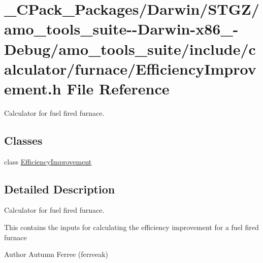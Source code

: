 \hypertarget{___c_pack___packages_2_darwin_2_s_t_g_z_2amo__tools__suite--_darwin-x86__64-_debug_2amo__tools__746a37b72f5159a376bd4f5e36a4146f}{}\section{\+\_\+\+C\+Pack\+\_\+\+Packages/\+Darwin/\+S\+T\+G\+Z/amo\+\_\+tools\+\_\+suite-\/-\/\+Darwin-\/x86\+\_-\/\+Debug/amo\+\_\+tools\+\_\+suite/include/calculator/furnace/\+Efficiency\+Improvement.h File Reference}
\label{___c_pack___packages_2_darwin_2_s_t_g_z_2amo__tools__suite--_darwin-x86__64-_debug_2amo__tools__746a37b72f5159a376bd4f5e36a4146f}


Calculator for fuel fired furnace.  


\subsection*{Classes}
\begin{DoxyCompactItemize}
\item 
class \hyperlink{class_efficiency_improvement}{Efficiency\+Improvement}
\end{DoxyCompactItemize}


\subsection{Detailed Description}
Calculator for fuel fired furnace. 

This contains the inputs for calculating the efficiency improvement for a fuel fired furnace

\begin{DoxyAuthor}{Author}
Autumn Ferree (ferreeak) 
\end{DoxyAuthor}
